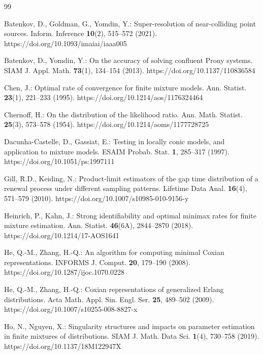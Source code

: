 \begin{thebibliography}{99}

Batenkov, D., Goldman, G., Yomdin, Y.: Super-resolution of near-colliding
point sources. Inform. Inference \textbf{10}(2), 515--572 (2021).
https://doi.org/10.1093/imaiai/iaaa005

Batenkov, D., Yomdin, Y.: On the accuracy of solving confluent Prony systems.
SIAM J. Appl. Math. \textbf{73}(1), 134--154 (2013).
https://doi.org/10.1137/110836584

Chen, J.: Optimal rate of convergence for finite mixture models. Ann. Statist.
\textbf{23}(1), 221--233 (1995).
https://doi.org/10.1214/aos/1176324464

Chernoff, H.: On the distribution of the likelihood ratio. Ann. Math. Statist.
\textbf{25}(3), 573--578 (1954).
https://doi.org/10.1214/aoms/1177728725

Dacunha-Castelle, D., Gassiat, E.: Testing in locally conic models, and
application to mixture models. ESAIM Probab. Stat. \textbf{1}, 285--317
(1997). https://doi.org/10.1051/ps:1997111

Gill, R.D., Keiding, N.: Product-limit estimators of the gap time distribution
of a renewal process under different sampling patterns. Lifetime Data Anal.
\textbf{16}(4), 571--579 (2010).
https://doi.org/10.1007/s10985-010-9156-y

Heinrich, P., Kahn, J.: Strong identifiability and optimal minimax rates for
finite mixture estimation. Ann. Statist. \textbf{46}(6A), 2844--2870 (2018).
https://doi.org/10.1214/17-AOS1641

He, Q.-M., Zhang, H.-Q.: An algorithm for computing minimal Coxian
representations. INFORMS J. Comput. \textbf{20}, 179--190 (2008).
https://doi.org/10.1287/ijoc.1070.0228

He, Q.-M., Zhang, H.-Q.: Coxian representations of generalized Erlang
distributions. Acta Math. Appl. Sin. Engl. Ser. \textbf{25}, 489--502 (2009).
https://doi.org/10.1007/s10255-008-8827-x

Ho, N., Nguyen, X.: Singularity structures and impacts on parameter estimation
in finite mixtures of distributions. SIAM J. Math. Data Sci. \textbf{1}(4),
730--758 (2019). https://doi.org/10.1137/18M122947X


\end{thebibliography}
